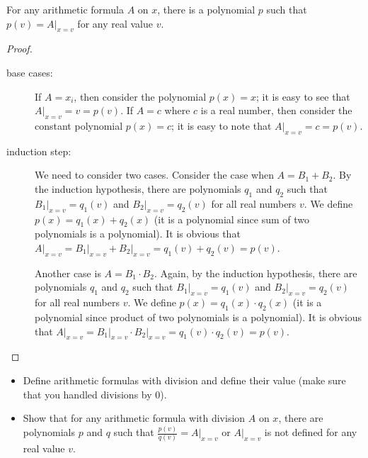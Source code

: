 \begin{theorem}
\label{theorem:formulas-to-polynomials}
  For any arithmetic formula $A$ on $x$, there is a polynomial
  $p$ such that $p(v) = A\big\rvert_{x = v}$ for any real value $v$.
\end{theorem}
\begin{proof}
  \begin{description}
    \item[base cases:] If $A = x_i$, then consider the polynomial $p(x) = x$;
      it is easy to see that $A\big\rvert_{x = v} = v = p(v)$.
      If $A = c$ where $c$ is a real number, then consider the constant
      polynomial  $p(x) = c$; it is easy to note that $A\big\rvert_{x = v} = c =
       p(v)$.
    \item[induction step:] We need to consider two cases. Consider the case when
      $A = B_1 + B_2$. By the induction hypothesis, there are polynomials $q_1$
      and $q_2$ such that $B_1\big\rvert_{x = v} = q_1(v)$ and
      $B_2\big\rvert_{x = v} = q_2(v)$ for all real numbers $v$.
      We define $p(x) = q_1(x) + q_2(x)$ (it is a polynomial since sum of
      two polynomials is a polynomial). It is obvious that
      $A\big\rvert_{x = v} = B_1\big\rvert_{x = v} + B_2\big\rvert_{x = v} =
      q_1(v) + q_2(v) = p(v)$.

      Another case is $A = B_1 \cdot B_2$. Again, by the induction hypothesis,
      there are polynomials $q_1$ and $q_2$ such that
      $B_1\big\rvert_{x = v} = q_1(v)$ and
      $B_2\big\rvert_{x = v} = q_2(v)$ for all real numbers $v$.
      We define $p(x) = q_1(x) \cdot q_2(x)$ (it is a polynomial since product of
      two polynomials is a polynomial). It is obvious that
      $A\big\rvert_{x = v} = B_1\big\rvert_{x = v} \cdot B_2\big\rvert_{x = v} =
      q_1(v) \cdot q_2(v) = p(v)$.
  \end{description}
\end{proof}

\begin{exercise}
  \begin{itemize}
    \item Define arithmetic formulas with division and define their value (make sure
      that you handled divisions by $0$).

    \item Show that for any arithmetic formula with division $A$ on $x$,
      there are polynomials $p$ and $q$ such that $\frac{p(v)}{q(v)} =
      A\big\rvert_{x = v}$ or $A\big\rvert_{x = v}$ is not defined for
      any real value $v$.
  \end{itemize}
\end{exercise}



